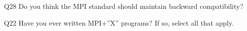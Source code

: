 \begin{description}%
\item{Q28} Do you think the MPI standard should maintain backward compatibility?%
\item{Q22} Have you ever written MPI+”X” programs? If so, select all that apply.%
\end{description}%
